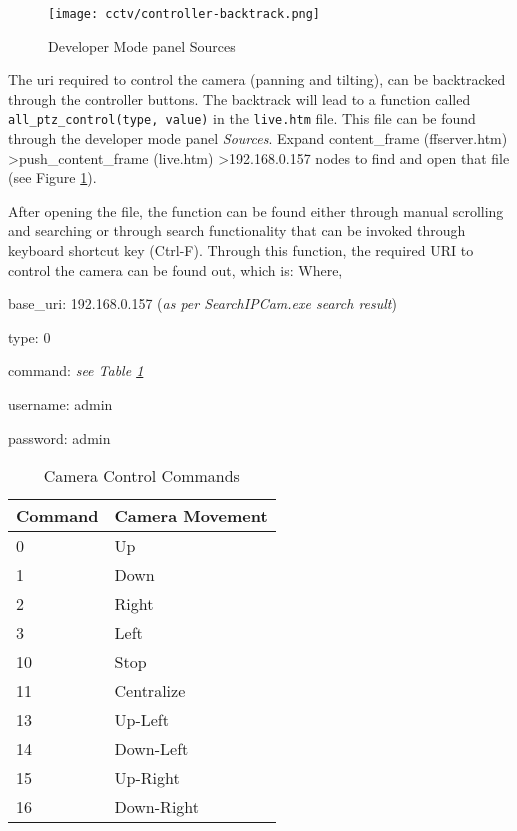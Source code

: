 \begin{figure}[ht]
\caption{Developer Mode panel Sources}
\label{developer-mode-panel-sources}
\centering
\texttt{[image: cctv/controller-backtrack.png]}
\end{figure}

The \ac{uri} required to control the camera (panning and tilting), can be backtracked through the controller buttons. The backtrack will lead to a function called \texttt{all\_ptz\_control(type, value)} in the \texttt{live.htm} file. This file can be found through the developer mode panel \emph{Sources}. Expand content\_frame (ffserver.htm) \textgreater push\_content\_frame (live.htm) \textgreater 192.168.0.157 nodes to find and open that file (see Figure \ref{developer-mode-panel-sources}).

After opening the file, the function can be found either through manual scrolling and searching or through search functionality that can be invoked through keyboard shortcut key (Ctrl-F). Through this function, the required URI to control the camera can be found out, which is:
\newline
{}
\newline
{}
\newline
Where,
\begin{itemize*}
\item base\_uri: 192.168.0.157 (\emph{as per SearchIPCam.exe search result})
\item type: 0
\item command: \emph{see Table \ref{camera-control-commands}}
\item username: admin
\item password: admin
\end{itemize*}

\begin{table}[ht]
\centering
\caption{Camera Control Commands}
\label{camera-control-commands}
\begin{tabular}{|l|l|}
\hline
Command & Camera Movement \\
\hline
0 & Up \\
1 & Down \\
2 & Right \\
3 & Left \\
10 & Stop \\
11 & Centralize \\
13 & Up-Left \\
14 & Down-Left \\
15 & Up-Right \\
16 & Down-Right\\
\hline
\end{tabular}
\end{table}

